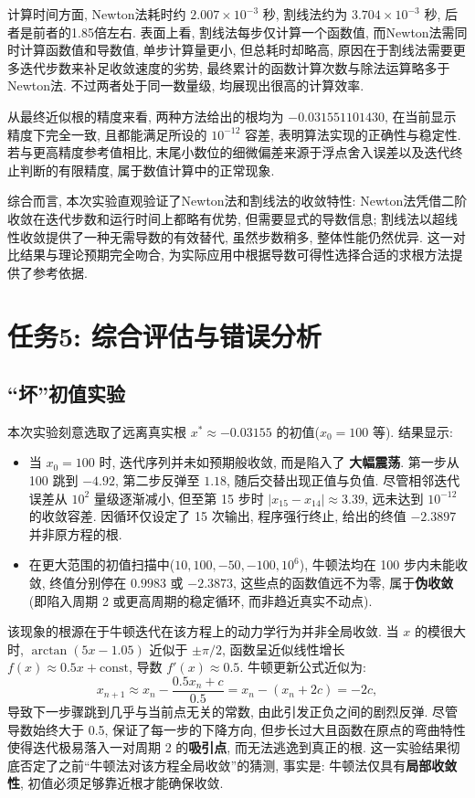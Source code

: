 \documentclass[12pt,a4paper]{ctexart}
\begin{document}
计算时间方面, Newton法耗时约 $2.007\times10^{-3}$ 秒, 割线法约为 $3.704\times10^{-3}$ 秒, 后者是前者的1.85倍左右. 表面上看, 割线法每步仅计算一个函数值, 而Newton法需同时计算函数值和导数值, 单步计算量更小, 但总耗时却略高, 原因在于割线法需要更多迭代步数来补足收敛速度的劣势, 最终累计的函数计算次数与除法运算略多于Newton法. 不过两者处于同一数量级, 均展现出很高的计算效率. 

从最终近似根的精度来看, 两种方法给出的根均为 $-0.031551101430$, 在当前显示精度下完全一致, 且都能满足所设的 $10^{-12}$ 容差, 表明算法实现的正确性与稳定性. 若与更高精度参考值相比, 末尾小数位的细微偏差来源于浮点舍入误差以及迭代终止判断的有限精度, 属于数值计算中的正常现象. 

综合而言, 本次实验直观验证了Newton法和割线法的收敛特性: Newton法凭借二阶收敛在迭代步数和运行时间上都略有优势, 但需要显式的导数信息; 割线法以超线性收敛提供了一种无需导数的有效替代, 虽然步数稍多, 整体性能仍然优异. 这一对比结果与理论预期完全吻合, 为实际应用中根据导数可得性选择合适的求根方法提供了参考依据. 

\section{任务5: 综合评估与错误分析}
\subsection{“坏”初值实验}

本次实验刻意选取了远离真实根 $x^* \approx -0.03155$ 的初值($x_0=100$ 等). 结果显示:

\begin{itemize}
    \item 当 $x_0=100$ 时, 迭代序列并未如预期般收敛, 而是陷入了 \textbf{大幅震荡}. 第一步从 100 跳到 $-4.92$, 第二步反弹至 $1.18$, 随后交替出现正值与负值. 尽管相邻迭代误差从 $10^2$ 量级逐渐减小, 但至第 15 步时 $|x_{15}-x_{14}| \approx 3.39$, 远未达到 $10^{-12}$ 的收敛容差. 因循环仅设定了 15 次输出, 程序强行终止, 给出的终值 $-2.3897$ 并非原方程的根. 
    
    \item 在更大范围的初值扫描中($10, 100, -50, -100, 10^6$), 牛顿法均在 100 步内未能收敛, 终值分别停在 $0.9983$ 或 $-2.3873$, 这些点的函数值远不为零, 属于\textbf{伪收敛}(即陷入周期 2 或更高周期的稳定循环, 而非趋近真实不动点). 
\end{itemize}

该现象的根源在于牛顿迭代在该方程上的动力学行为并非全局收敛. 当 $x$ 的模很大时, $\arctan(5x-1.05)$ 近似于 $\pm\pi/2$, 函数呈近似线性增长 $f(x) \approx 0.5x + \text{const}$, 导数 $f'(x) \approx 0.5$. 牛顿更新公式近似为: 
\[
x_{n+1} \approx x_n - \frac{0.5x_n + c}{0.5} = x_n - (x_n + 2c) = -2c,
\]
导致下一步骤跳到几乎与当前点无关的常数, 由此引发正负之间的剧烈反弹. 尽管导数始终大于 0.5, 保证了每一步的下降方向, 但步长过大且函数在原点的弯曲特性使得迭代极易落入一对周期 2 的\textbf{吸引点}, 而无法逃逸到真正的根. 这一实验结果彻底否定了之前“牛顿法对该方程全局收敛”的猜测, 事实是: 牛顿法仅具有\textbf{局部收敛性}, 初值必须足够靠近根才能确保收敛. 
\end{document}
